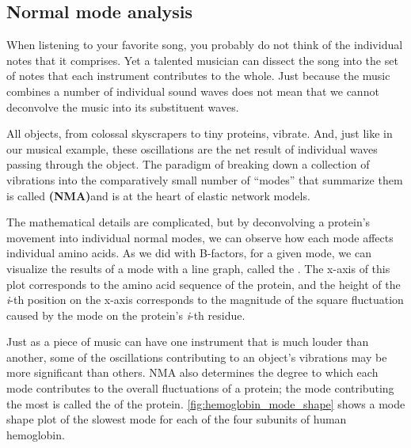 \FloatBarrier
{}
\subsection{Normal mode analysis}

When listening to your favorite song, you probably do not think of the individual notes that it comprises. Yet a talented musician can dissect the song into the set of notes that each instrument contributes to the whole. Just because the music combines a number of individual sound waves does not mean that we cannot deconvolve the music into its substituent waves.

All objects, from colossal skyscrapers to tiny proteins, vibrate. And, just like in our musical example, these oscillations are the net result of individual waves passing through the object. The paradigm of breaking down a collection of vibrations into the comparatively small number of ``modes'' that summarize them is called  \textbf{(NMA)}and is at the heart of elastic network models.

The mathematical details are complicated, but by deconvolving a protein's movement into individual normal modes, we can observe how each mode affects individual amino acids. As we did with B-factors, for a given mode, we can visualize the results of a mode with a line graph, called the . The x-axis of this plot corresponds to the amino acid sequence of the protein, and the height of the \textit{i}-th position on the x-axis corresponds to the magnitude of the square fluctuation caused by the mode on the protein's \textit{i}-th residue.

Just as a piece of music can have one instrument that is much louder than another, some of the oscillations contributing to an object's vibrations may be more significant than others. NMA also determines the degree to which each mode contributes to the overall fluctuations of a protein; the mode contributing the most is called the  of the protein. \autoref{fig:hemoglobin_mode_shape} shows a mode shape plot of the slowest mode for each of the four subunits of human hemoglobin.

